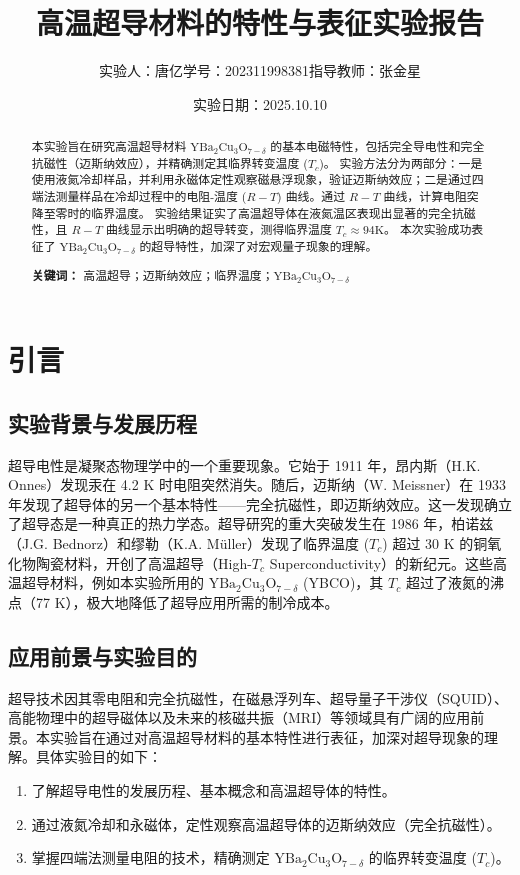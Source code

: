 \documentclass[a4paper, 1.5lines]{ctexart}
\title{高温超导材料的特性与表征实验报告}
\author{实验人：唐亿\qquad 学号：202311998381\qquad 指导教师：张金星}
\date{实验日期：2025.10.10}
\begin{document}
    
    \maketitle
    
    \begin{abstract}
          本实验旨在研究高温超导材料 $\text{YBa}_2\text{Cu}_3\text{O}_{7-\delta}$ 的基本电磁特性，包括完全导电性和完全抗磁性（迈斯纳效应），并精确测定其临界转变温度 ($T_c$)。
          实验方法分为两部分：一是使用液氮冷却样品，并利用永磁体定性观察磁悬浮现象，验证迈斯纳效应；二是通过四端法测量样品在冷却过程中的电阻-温度 ($R-T$) 曲线。通过 $R-T$ 曲线，计算电阻突降至零时的临界温度。
          实验结果证实了高温超导体在液氮温区表现出显著的完全抗磁性，且 $R-T$ 曲线显示出明确的超导转变，测得临界温度 $T_c \approx 94\text{K}$。
          本次实验成功表征了 $\text{YBa}_2\text{Cu}_3\text{O}_{7-\delta}$ 的超导特性，加深了对宏观量子现象的理解。

          \textbf{关键词：} 高温超导；迈斯纳效应；临界温度；$\text{YBa}_2\text{Cu}_3\text{O}_{7-\delta}$
    \end{abstract}
    
    \section{引言}
        \label{sec:introduction}

        \subsection{实验背景与发展历程}
        超导电性是凝聚态物理学中的一个重要现象。它始于 1911 年，昂内斯（H.K. Onnes）发现汞在 4.2 K 时电阻突然消失。随后，迈斯纳（W. Meissner）在 1933 年发现了超导体的另一个基本特性——完全抗磁性，即迈斯纳效应。这一发现确立了超导态是一种真正的热力学态。超导研究的重大突破发生在 1986 年，柏诺兹（J.G. Bednorz）和缪勒（K.A. Müller）发现了临界温度 ($T_c$) 超过 30 K 的铜氧化物陶瓷材料，开创了高温超导（High-$T_c$ Superconductivity）的新纪元。这些高温超导材料，例如本实验所用的 $\text{YBa}_2\text{Cu}_3\text{O}_{7-\delta}$ (YBCO)，其 $T_c$ 超过了液氮的沸点（77 K），极大地降低了超导应用所需的制冷成本。

        \subsection{应用前景与实验目的}
        超导技术因其零电阻和完全抗磁性，在磁悬浮列车、超导量子干涉仪（SQUID）、高能物理中的超导磁体以及未来的核磁共振（MRI）等领域具有广阔的应用前景。本实验旨在通过对高温超导材料的基本特性进行表征，加深对超导现象的理解。具体实验目的如下：
        \begin{enumerate}
            \item 了解超导电性的发展历程、基本概念和高温超导体的特性。
            \item 通过液氮冷却和永磁体，定性观察高温超导体的迈斯纳效应（完全抗磁性）。
            \item 掌握四端法测量电阻的技术，精确测定 $\text{YBa}_2\text{Cu}_3\text{O}_{7-\delta}$ 的临界转变温度 ($T_c$)。
        \end{enumerate}
\end{document}

